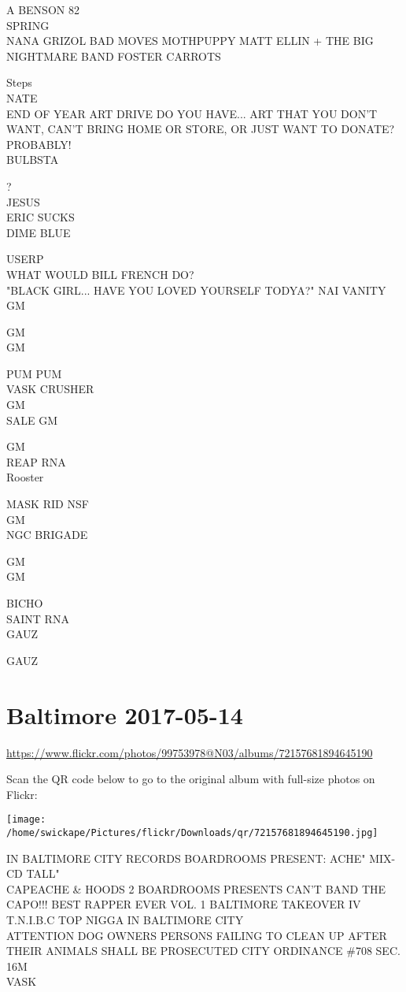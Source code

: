 \documentclass[10pt,letterpaper]{article}
\begin{document}
A BENSON 82\\
SPRING\\
NANA GRIZOL BAD MOVES MOTHPUPPY MATT ELLIN + THE BIG NIGHTMARE BAND FOSTER CARROTS

Steps\\
NATE\\
END OF YEAR ART DRIVE DO YOU HAVE... ART THAT YOU DON'T WANT, CAN'T BRING HOME OR STORE, OR JUST WANT TO DONATE?  PROBABLY!\\
BULBSTA

?\\
JESUS\\
ERIC SUCKS\\
DIME BLUE

USERP\\
WHAT WOULD BILL FRENCH DO?\\
"BLACK GIRL... HAVE YOU LOVED YOURSELF TODYA?"  NAI VANITY\\
GM

GM\\
GM

PUM PUM\\
VASK CRUSHER\\
GM\\
SALE GM

GM\\
REAP RNA\\
Rooster

MASK RID NSF\\
GM\\
NGC BRIGADE

GM\\
GM

BICHO\\
SAINT RNA\\
GAUZ

GAUZ
\pagebreak

\section*{Baltimore 2017-05-14}

\url{https://www.flickr.com/photos/99753978@N03/albums/72157681894645190}

Scan the QR code below to go to the original album with full-size photos on Flickr:

\texttt{[image: /home/swickape/Pictures/flickr/Downloads/qr/72157681894645190.jpg]}
\pagebreak

IN BALTIMORE CITY RECORDS BOARDROOMS PRESENT: ACHE" MIX{-}CD TALL"\\
CAPEACHE \& HOODS 2 BOARDROOMS PRESENTS CAN'T BAND THE CAPO!!! BEST RAPPER EVER VOL. 1 BALTIMORE TAKEOVER IV T.N.I.B.C TOP NIGGA IN BALTIMORE CITY\\
ATTENTION DOG OWNERS PERSONS FAILING TO CLEAN UP AFTER THEIR ANIMALS SHALL BE PROSECUTED CITY ORDINANCE \#708 SEC. 16M\\
VASK
\end{document}

